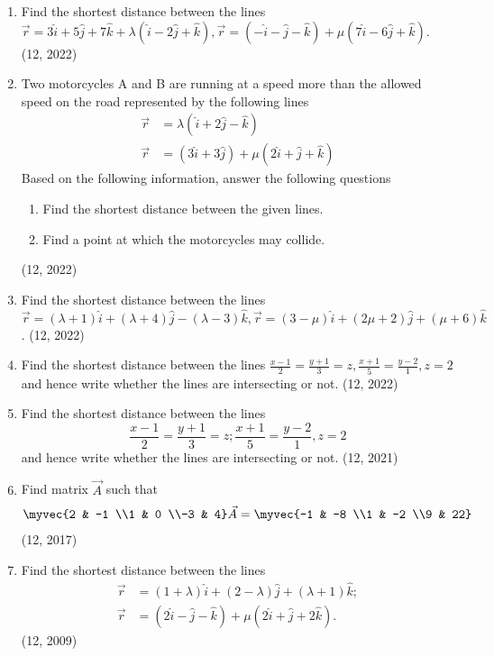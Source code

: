 \begin{enumerate}[label=\thesubsection.\arabic*,ref=\thesubsection.\theenumi]
\item Find the shortest distance between the lines
		$\vec{r}=3\hat{i}+5\hat{j}+7\hat{k}+\lambda(\hat{i}-2\hat{j}+\hat{k}),
		\vec{r}=(-\hat{i}-\hat{j}-\hat{k})+\mu(7\hat{i}-6\hat{j}+\hat{k})$.
\hfill (12, 2022)
\item Two motorcycles A and B are running at a speed more than the allowed speed on the road  represented by the following lines 
	\begin{align*}
		\vec{r}&=\lambda(\hat{i}+2\hat{j}-\hat{k})\\
		\vec{r}&=(3\hat{i}+3\hat{j})+\mu(2\hat{i}+\hat{j}+\hat{k})
	\end{align*}
	Based on the following information, answer the following questions
	\begin{enumerate}
		\item Find the shortest distance between the given lines.
		\item Find a point at which the motorcycles may collide.
	\end{enumerate}
\hfill (12, 2022)

\item Find the shortest distance between the lines
		$\vec{r}=(\lambda+1)\hat{i}+(\lambda+4)\hat{j}-(\lambda-3)\hat{k},
		\vec{r}=(3-\mu)\hat{i}+(2\mu+2)\hat{j}+(\mu+6)\hat{k}$.
\hfill (12, 2022)

\item Find the shortest distance between the lines 
		$\frac{x-1}{2}=\frac{y+1}{3}=z, \frac{x+1}{5}=\frac{y-2}{1}, z=2$
and hence write whether the lines are intersecting or not.
\hfill (12, 2022)
\item Find the shortest distance between the 
lines 
  $$\frac{x-1}{2} = \frac{y+1}{3} = z;
  \frac{x+1}{5} =\frac{y-2}{1},z=2$$
and hence write
whether the lines are intersecting or not.
\hfill (12, 2021)
\item Find matrix $\vec{A}$ such that
\begin{align*}
   \myvec{2 & -1 \\1 & 0 \\-3 & 4} \vec{A}=\myvec{-1 & -8 \\1 & -2 \\9 & 22} 
\end{align*} 
\hfill (12, 2017)
\item 
Find the shortest distance between the lines
\begin{align*}
	\vec{r} &= (1 + \lambda)\hat{i} + (2 - \lambda)\hat{j} + (\lambda + 1)\hat{k};
\\
	\vec{r} &= (2\hat{i} - \hat{j} - \hat{k}) + \mu(2\hat{i} + \hat{j} + 2\hat{k}).
\end{align*}
\hfill	(12, 2009)


\end{enumerate}
